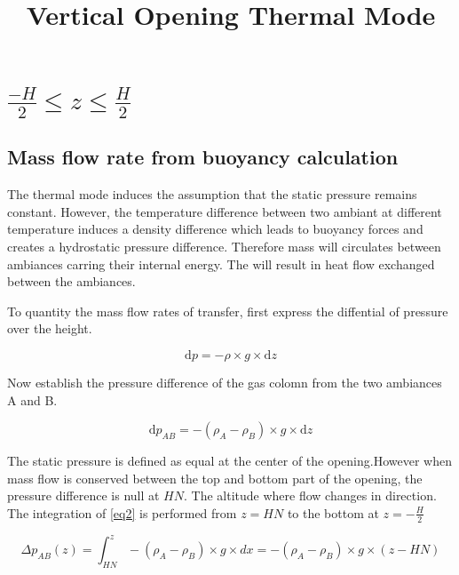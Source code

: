 \documentclass[a4paper, english]{article}
\title{Vertical Opening Thermal Mode}
\begin{document}
    \maketitle
    
    \section{$\frac{-H}{2} \leq z \leq \frac{H}{2} $}
    
        \subsection{Mass flow rate from buoyancy calculation}
        
            The thermal mode induces the assumption that the static pressure remains constant. However, the temperature difference between two ambiant at different temperature induces a density difference which leads to buoyancy forces and creates a hydrostatic pressure difference. Therefore mass will circulates between ambiances carring their internal energy. The will result in heat flow exchanged between the ambiances.
            
            To quantity the mass flow rates of transfer, first express the diffential of pressure over the height.

            \begin{equation}
                \label{eq1}
                \mathrm{d}p = -\rho \times g \times \mathrm{d} z
            \end{equation}
            
            Now establish the pressure difference of the gas colomn from the two ambiances A and B.
            
            \begin{equation}
                \label{eq2}
                \mathrm{d}p_{AB} = -(\rho_A - \rho_B) \times g \times \mathrm{d} z
            \end{equation}       
            
            
            The static pressure is defined as equal at the center of the opening.However when mass flow is conserved between the top and bottom part of the opening, the pressure difference is null at $ HN $. The altitude where flow changes in direction. The integration of \eqref{eq2} is performed from $ z = HN $ to the bottom at $ z = -\frac{H}{2} $

            
            \begin{equation}
                \label{eq3}
                \Delta p_{AB}(z) = \int_{HN}^{z} -(\rho_A - \rho_B) \times g \times dx = -(\rho_A - \rho_B) \times g \times (z - HN)
            \end{equation} 
            
\end{document}
